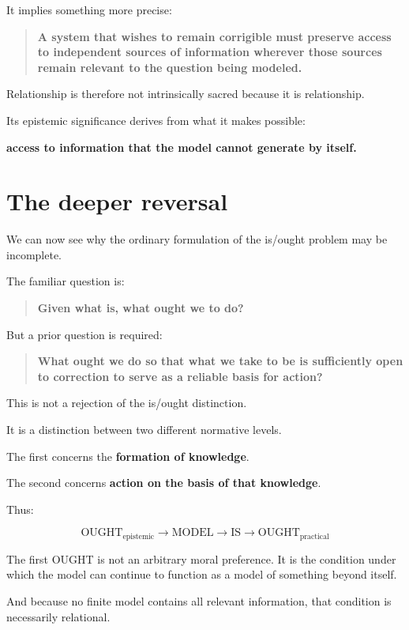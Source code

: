 \documentclass{article}
\begin{document}
It implies something more precise:

\begin{quote}
    \textbf{A system that wishes to remain corrigible must preserve access to independent sources of information wherever those sources remain relevant to the question being modeled.}
\end{quote}

Relationship is therefore not intrinsically sacred because it is relationship.

Its epistemic significance derives from what it makes possible:

\textbf{access to information that the model cannot generate by itself.}

\section*{The deeper reversal}

We can now see why the ordinary formulation of the is/ought problem may be incomplete.

The familiar question is:

\begin{quote}
    \textbf{Given what is, what ought we to do?}
\end{quote}

But a prior question is required:

\begin{quote}
    \textbf{What ought we do so that what we take to be is sufficiently open to correction to serve as a reliable basis for action?}
\end{quote}

This is not a rejection of the is/ought distinction.

It is a distinction between two different normative levels.

The first concerns the \textbf{formation of knowledge}.

The second concerns \textbf{action on the basis of that knowledge}.

Thus:

\[
\text{OUGHT}_{\text{epistemic}} \rightarrow \text{MODEL} \rightarrow \text{IS} \rightarrow \text{OUGHT}_{\text{practical}}
\]

The first OUGHT is not an arbitrary moral preference. It is the condition under which the model can continue to function as a model of something beyond itself.

And because no finite model contains all relevant information, that condition is necessarily relational.
\end{document}
